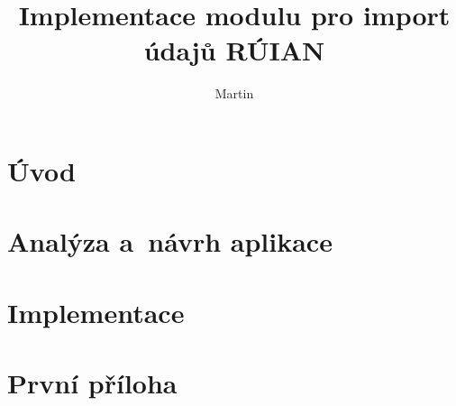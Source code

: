 \documentclass[czech, kiv, ba, he, iso690numb, pdf]{fasthesis}
\title{Implementace modulu pro import údajů RÚIAN}
\author{Martin}{Schön}{}{}
\begin{document}
\frontpages[tm]
\tableofcontents

\chapter{Úvod}


\chapter{Analýza a~návrh aplikace}






\chapter{Implementace}









 
\appendix
\chapter{První příloha}
\backmatter
\printbibliography
\setbackpageqrcode
\backpage
\end{document}
